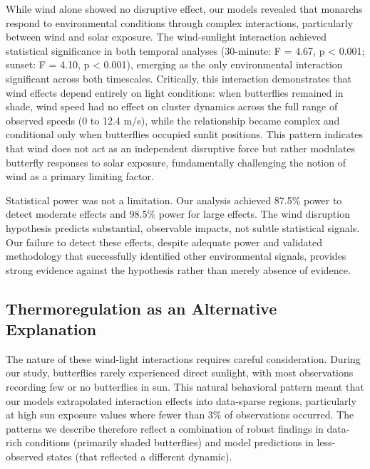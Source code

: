 While wind alone showed no disruptive effect, our models revealed that monarchs respond to environmental conditions through complex interactions, particularly between wind and solar exposure. The wind-sunlight interaction achieved statistical significance in both temporal analyses (30-minute: F = 4.67, p < 0.001; sunset: F = 4.10, p < 0.001), emerging as the only environmental interaction significant across both timescales. Critically, this interaction demonstrates that wind effects depend entirely on light conditions: when butterflies remained in shade, wind speed had no effect on cluster dynamics across the full range of observed speeds (0 to 12.4 m/s), while the relationship became complex and conditional only when butterflies occupied sunlit positions. This pattern indicates that wind does not act as an independent disruptive force but rather modulates butterfly responses to solar exposure, fundamentally challenging the notion of wind as a primary limiting factor.

Statistical power was not a limitation. Our analysis achieved 87.5\% power to detect moderate effects and 98.5\% power for large effects. The wind disruption hypothesis predicts substantial, observable impacts, not subtle statistical signals. Our failure to detect these effects, despite adequate power and validated methodology that successfully identified other environmental signals, provides strong evidence against the hypothesis rather than merely absence of evidence.

\subsection{Thermoregulation as an Alternative Explanation}

The nature of these wind-light interactions requires careful consideration. During our study, butterflies rarely experienced direct sunlight, with most observations recording few or no butterflies in sun. This natural behavioral pattern meant that our models extrapolated interaction effects into data-sparse regions, particularly at high sun exposure values where fewer than 3\% of observations occurred. The patterns we describe therefore reflect a combination of robust findings in data-rich conditions (primarily shaded butterflies) and model predictions in less-observed states (that reflected a different dynamic).

